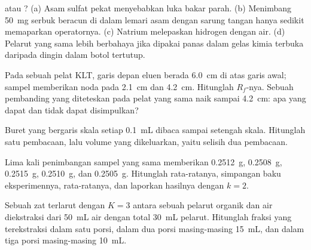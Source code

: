\begin{exercise}[$\star$]\label{exo:b1:lab-techniques-1:2}
 atau ? (a) Asam sulfat pekat menyebabkan luka bakar parah.
(b) Menimbang \qty{50}{mg} serbuk beracun di dalam lemari asam dengan
sarung tangan hanya sedikit memaparkan operatornya. (c) Natrium
melepaskan hidrogen dengan air. (d) Pelarut yang sama lebih berbahaya
jika dipakai panas dalam gelas kimia terbuka daripada dingin dalam botol
tertutup.
\end{exercise}

\begin{exercise}[$\star$]\label{exo:b1:lab-techniques-1:3}
Pada sebuah pelat KLT, garis depan eluen berada \qty{6.0}{cm} di atas
garis awal; sampel memberikan noda pada \qty{2.1}{cm} dan
\qty{4.2}{cm}. Hitunglah
$R_f$-nya. Sebuah pembanding yang diteteskan pada pelat yang sama naik
sampai \qty{4.2}{cm}: apa yang dapat dan tidak dapat disimpulkan?
\end{exercise}

\begin{exercise}[$\star$]\label{exo:b1:lab-techniques-1:4}
Buret yang bergaris skala setiap \qty{0.1}{mL} dibaca sampai setengah
skala. Hitunglah  satu pembacaan, lalu  volume yang dikeluarkan, yaitu selisih dua pembacaan.
\end{exercise}

\begin{exercise}[$\star\star$]\label{exo:b1:lab-techniques-1:5}
Lima kali penimbangan sampel yang sama memberikan \qty{0.2512}{g},
\qty{0.2508}{g}, \qty{0.2515}{g}, \qty{0.2510}{g}, dan \qty{0.2505}{g}.
Hitunglah rata-ratanya, simpangan baku eksperimennya,  rata-ratanya, dan laporkan hasilnya dengan $k = 2$.
\end{exercise}

\begin{exercise}[$\star\star$]\label{exo:b1:lab-techniques-1:6}
Sebuah zat terlarut dengan  $K = 3$ antara sebuah
pelarut organik dan air diekstraksi dari \qty{50}{mL} air dengan total
\qty{30}{mL} pelarut. Hitunglah fraksi yang terekstraksi dalam satu porsi,
dalam dua porsi masing-masing \qty{15}{mL}, dan dalam tiga porsi
masing-masing \qty{10}{mL}.
\end{exercise}

